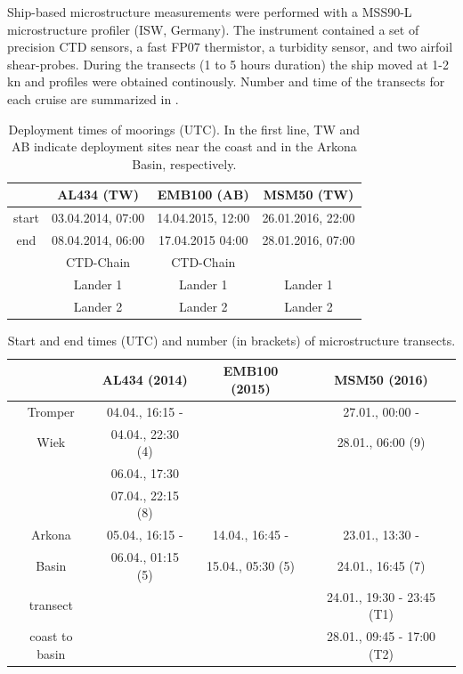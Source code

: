 Ship-based microstructure measurements were performed with a MSS90-L 
microstructure profiler (ISW, Germany). The instrument contained a set of 
precision CTD sensors, a fast FP07 thermistor, a turbidity sensor, and two 
airfoil shear-probes. During the transects (1 to 5 hours duration) the ship 
moved at 1-2 kn and profiles were obtained continously. Number and time of the 
transects for each cruise are summarized in .

 \begin{table}
\caption{Deployment times of moorings (UTC). In the first 
line, TW and AB indicate deployment sites near the coast and in the Arkona 
Basin, respectively.}\label{deployments}
\begin{center}
\begin{tabular}{cccc}
\hline
\hline
 & AL434 (TW) & EMB100 (AB) & MSM50 (TW) \\
 \hline
 start & 03.04.2014, 07:00 & 14.04.2015, 12:00 & 26.01.2016, 22:00 \\ 
 end & 08.04.2014, 06:00 & 17.04.2015 04:00 & 28.01.2016, 07:00 \\
\hline
 & CTD-Chain & CTD-Chain & \\
 & Lander 1 & Lander 1 & Lander 1\\
 & Lander 2 & Lander 2 & Lander 2\\
\hline
\end{tabular}
\end{center}
\end{table}

 \begin{table}
\caption{Start and end times (UTC) and number (in brackets) of microstructure 
transects.}\label{mss}
\begin{center}
\begin{tabular}{cccc}
\hline
\hline
 & AL434 (2014) & EMB100 (2015) & MSM50 (2016)\\
 \hline
Tromper & 04.04., 16:15 - & & 27.01., 00:00 - \\ 
Wiek & 04.04., 22:30 (4) & & 28.01., 06:00 (9)\\
 & 06.04., 17:30 & & \\
 &  07.04., 22:15 (8) & & \\
\hline
Arkona & 05.04., 16:15 - & 14.04., 16:45 - & 23.01., 13:30 - \\
Basin & 06.04., 01:15 (5) & 15.04., 05:30 (5) & 24.01., 16:45 (7)\\
\hline
transect &  & & 24.01., 19:30 - 23:45 (T1)\\
coast to basin & & & 28.01., 09:45 - 17:00 (T2)\\
\hline
\end{tabular}
\end{center}
\end{table}

